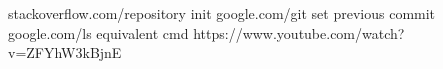 \begin{thebibliography}{99999}
\singlespace\normalsize


 stackoverflow.com/repository init
 google.com/git set previous commit 
 google.com/ls equivalent cmd
 https://www.youtube.com/watch?v=ZFYhW3kBjnE




\end{thebibliography}
